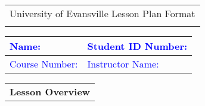 \documentclass[10pt]{article} %
\begin{document}
\begin{tabularx}{\textwidth}{Y}
  {\large University of Evansville Lesson Plan Format } \\
   \hline \\
\end{tabularx}


\begin{tabularx}{\textwidth}{|X|X|}
  \hline 
  \textcolor{blue}{Name:}          &   \textcolor{blue}{Student ID Number:} \\
  \hline 
  \textcolor{blue}{Course Number:} &   \textcolor{blue}{Instructor Name:} \\
  \hline 
\end{tabularx}

\vskip 10pt
  
\begin{tabularx}{\textwidth}{Y}
  {\bf Lesson Overview} \\
\end{tabularx}
\end{document}
